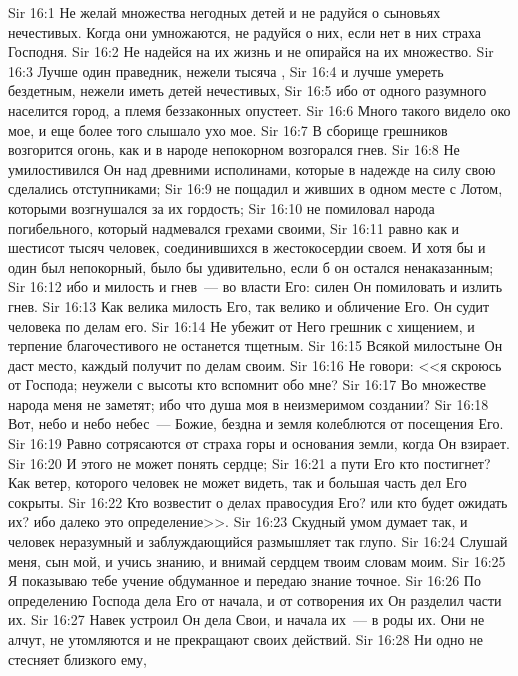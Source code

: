 \vs Sir 16:1 Не желай множества негодных детей и не радуйся о сыновьях нечестивых. Когда они умножаются, не радуйся о них, если нет в них страха Господня.
\vs Sir 16:2 Не надейся на их жизнь и не опирайся на их множество.
\vs Sir 16:3 Лучше один праведник, нежели тысяча ,
\vs Sir 16:4 и лучше умереть бездетным, нежели иметь детей нечестивых,
\vs Sir 16:5 ибо от одного разумного населится город, а племя беззаконных опустеет.
\vs Sir 16:6 Много такого видело око мое, и еще более того слышало ухо мое.
\vs Sir 16:7 В сборище грешников возгорится огонь, как и в народе непокорном возгорался гнев.
\vs Sir 16:8 Не умилостивился Он над древними исполинами, которые в надежде на силу свою сделались отступниками;
\vs Sir 16:9 не пощадил и живших в одном месте с Лотом, которыми возгнушался за их гордость;
\vs Sir 16:10 не помиловал народа погибельного, который надмевался грехами своими,
\vs Sir 16:11 равно как и шестисот тысяч человек, соединившихся в жестокосердии своем. И хотя бы и один был непокорный, было бы удивительно, если б он остался ненаказанным;
\vs Sir 16:12 ибо и милость и гнев~--- во власти Его: силен Он помиловать и излить гнев.
\vs Sir 16:13 Как велика милость Его, так велико и обличение Его. Он судит человека по делам его.
\vs Sir 16:14 Не убежит от Него грешник с хищением, и терпение благочестивого не останется тщетным.
\vs Sir 16:15 Всякой милостыне Он даст место, каждый получит по делам своим.
\vs Sir 16:16 Не говори: <<я скроюсь от Господа; неужели с высоты кто вспомнит обо мне?
\vs Sir 16:17 Во множестве народа меня не заметят; ибо что душа моя в неизмеримом создании?
\vs Sir 16:18 Вот, небо и небо небес~--- Божие, бездна и земля колеблются от посещения Его.
\vs Sir 16:19 Равно сотрясаются от страха горы и основания земли, когда Он взирает.
\vs Sir 16:20 И этого не может понять сердце;
\vs Sir 16:21 а пути Его кто постигнет? Как ветер, которого человек не может видеть, так и большая часть дел Его сокрыты.
\vs Sir 16:22 Кто возвестит о делах правосудия Его? или кто будет ожидать их? ибо далеко это определение>>.
\vs Sir 16:23 Скудный умом думает так, и человек неразумный и заблуждающийся размышляет так глупо.
\rsbpar\vs Sir 16:24 Слушай меня, сын мой, и учись знанию, и внимай сердцем твоим словам моим.
\vs Sir 16:25 Я показываю тебе учение обдуманное и передаю знание точное.
\vs Sir 16:26 По определению Господа дела Его от начала, и от сотворения их Он разделил части их.
\vs Sir 16:27 Навек устроил Он дела Свои, и начала их~--- в роды их. Они не алчут, не утомляются и не прекращают своих действий.
\vs Sir 16:28 Ни одно не стесняет близкого ему,
